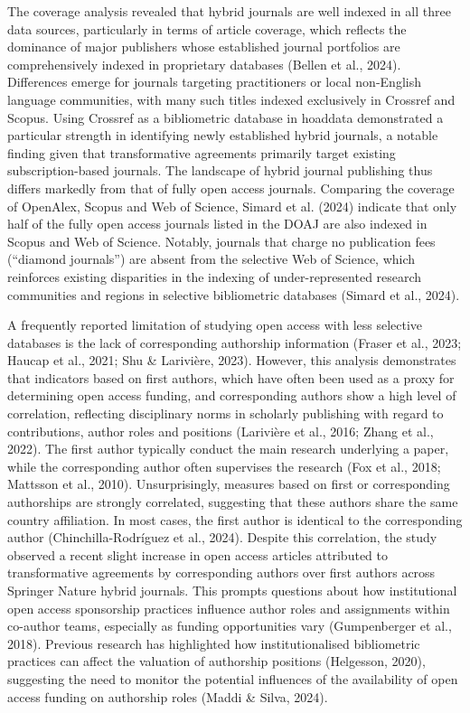 \documentclass[a4paper,man,floatsintext,longtable,noextraspace,10pt]{apa6}
\begin{document}
The coverage analysis revealed that hybrid journals are well indexed in
all three data sources, particularly in terms of article coverage, which
reflects the dominance of major publishers whose established journal
portfolios are comprehensively indexed in proprietary databases (Bellen
et al., 2024). Differences emerge for journals targeting practitioners
or local non-English language communities, with many such titles indexed
exclusively in Crossref and Scopus. Using Crossref as a bibliometric
database in hoaddata demonstrated a particular strength in identifying
newly established hybrid journals, a notable finding given that
transformative agreements primarily target existing subscription-based
journals. The landscape of hybrid journal publishing thus differs
markedly from that of fully open access journals. Comparing the coverage
of OpenAlex, Scopus and Web of Science, Simard et al. (2024) indicate
that only half of the fully open access journals listed in the DOAJ are
also indexed in Scopus and Web of Science. Notably, journals that charge
no publication fees (``diamond journals'') are absent from the selective
Web of Science, which reinforces existing disparities in the indexing of
under-represented research communities and regions in selective
bibliometric databases (Simard et al., 2024).

A frequently reported limitation of studying open access with less
selective databases is the lack of corresponding authorship information
(Fraser et al., 2023; Haucap et al., 2021; Shu \& Larivière, 2023).
However, this analysis demonstrates that indicators based on first
authors, which have often been used as a proxy for determining open
access funding, and corresponding authors show a high level of
correlation, reflecting disciplinary norms in scholarly publishing with
regard to contributions, author roles and positions (Larivière et al.,
2016; Zhang et al., 2022). The first author typically conduct the main
research underlying a paper, while the corresponding author often
supervises the research (Fox et al., 2018; Mattsson et al., 2010).
Unsurprisingly, measures based on first or corresponding authorships are
strongly correlated, suggesting that these authors share the same
country affiliation. In most cases, the first author is identical to the
corresponding author (Chinchilla-Rodríguez et al., 2024). Despite this
correlation, the study observed a recent slight increase in open access
articles attributed to transformative agreements by corresponding
authors over first authors across Springer Nature hybrid journals. This
prompts questions about how institutional open access sponsorship
practices influence author roles and assignments within co-author teams,
especially as funding opportunities vary (Gumpenberger et al., 2018).
Previous research has highlighted how institutionalised bibliometric
practices can affect the valuation of authorship positions (Helgesson,
2020), suggesting the need to monitor the potential influences of the
availability of open access funding on authorship roles (Maddi \& Silva,
2024).
\end{document}
